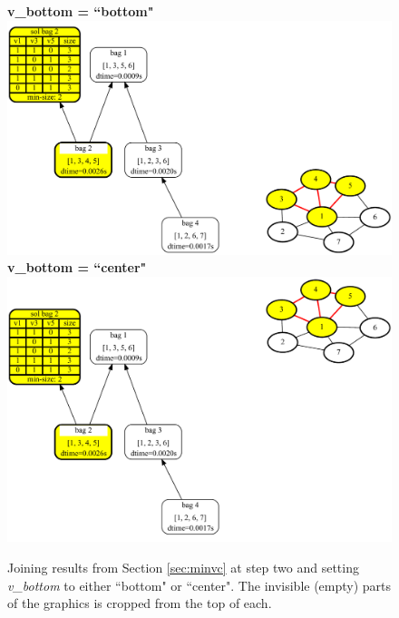 \documentclass[a4paper, 12pt, bibliography=totoc]{scrartcl}
\begin{document}
\begin{figure}[H]
	\centering
	\textbf{v\_bottom = ``bottom"} \vspace{1em}\\
	
	\includegraphics[width=\linewidth]{images/SVGJOIN/default_bottom2.pdf}\\
	\vspace{0.5em}
	\textbf{v\_bottom = ``center"}\\
	
	\vspace{0.6em}
	\includegraphics[width=0.9\linewidth]{images/SVGJOIN/default_center2.pdf}
	\caption[Joining results and shifting vertically to bottom and center]{Joining results from Section \ref{sec:minvc} at step two and setting \textit{v\_bottom} to either ``bottom" or ``center". The invisible (empty) parts of the graphics is cropped from the top of each.}
	\label{fig:joinbotcenter}
\end{figure}
\end{document}
